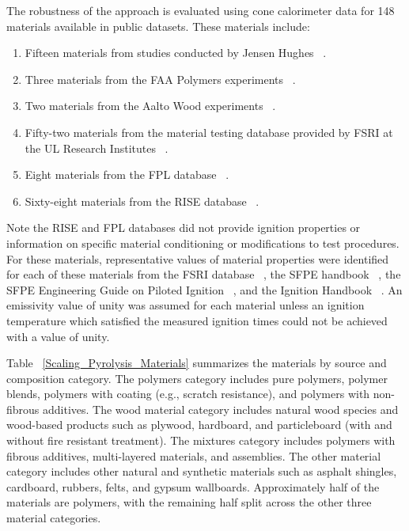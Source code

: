 The robustness of the approach is evaluated using cone calorimeter data for 148 materials available in public datasets.
These materials include:
\begin{enumerate}
\item Fifteen materials from studies conducted by Jensen Hughes ~\cite{Luo:FRA2019,Lattimer:NIJ19}.
\item Three materials from the FAA Polymers experiments ~\cite{Stoliarov:CF2009,Stoliarov:FM2012}.
\item Two materials from the Aalto Wood experiments ~\cite{Rinta-Paavola:2023}.
\item Fifty-two materials from the material testing database provided by FSRI at the UL Research Institutes ~\cite{McKinnon:FSRI2023_Data}.
\item Eight materials from the FPL database ~\cite{FPL:Fire_Database}.
\item Sixty-eight materials from the RISE database ~\cite{RISE:Fire_Database}.
\end{enumerate}
Note the RISE and FPL databases did not provide ignition properties or information on specific material conditioning or modifications to test procedures.
For these materials, representative values of material properties were identified for each of these materials from the FSRI database ~\cite{McKinnon:FSRI2023_Data}, the SFPE handbook ~\cite{SFPE:Tewarson},
the SFPE Engineering Guide on Piloted Ignition ~\cite{Beyler2002}, and the Ignition Handbook ~\cite{Babrauskas:2}. 
An emissivity value of unity was assumed for each material unless an ignition temperature which satisfied the measured ignition times could not be achieved with a value of unity.

Table ~\ref{Scaling_Pyrolysis_Materials} summarizes the materials by source and composition category.
The polymers category includes pure polymers, polymer blends, polymers with coating (e.g., scratch resistance), and polymers with non-fibrous additives.
The wood material category includes natural wood species and wood-based products such as plywood, hardboard, and particleboard (with and without fire resistant treatment).
The mixtures category includes polymers with fibrous additives, multi-layered materials, and assemblies.
The other material category includes other natural and synthetic materials such as asphalt shingles, cardboard, rubbers, felts, and gypsum wallboards.
Approximately half of the materials are polymers, with the remaining half split across the other three material categories.

